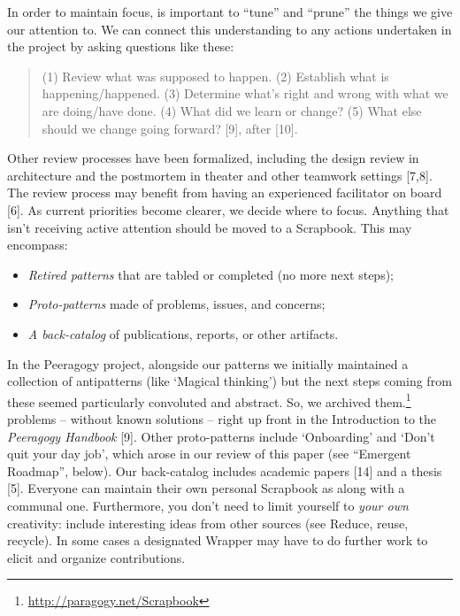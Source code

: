 In order to maintain focus, is important to ``tune'' and ``prune'' the
things we give our attention to. We can connect this understanding to
any actions undertaken in the project by asking questions like these:

\begin{quote}
(1) Review what was supposed to happen. (2) Establish what is
happening/happened. (3) Determine what's right and wrong with what we
are doing/have done. (4) What did we learn or change? (5) What else
should we change going forward? {{[}9{]}}, after {{[}10{]}}.
\end{quote}

Other review processes have been formalized, including the design review
in architecture and the postmortem in theater and other teamwork
settings {{[}7,8{]}}. The review process may benefit from having an
experienced facilitator on board {{[}6{]}}. As current priorities become
clearer, we decide where to focus. Anything that isn't receiving active
attention should be moved to a {{Scrapbook}}. This may encompass:

\begin{itemize}
\tightlist
\item
  \emph{Retired patterns} that are tabled or completed (no more next
  steps);
\item
  \emph{Proto-patterns} made of problems, issues, and concerns;
\item
  \emph{A back-catalog} of publications, reports, or other artifacts.
\end{itemize}

In the Peeragogy project, alongside our patterns we initially maintained
a collection of antipatterns (like `{{Magical thinking}}') but the next
steps coming from these seemed particularly convoluted and abstract. So,
we archived them.\footnote{\url{http://paragogy.net/Scrapbook}} problems
-- without known solutions -- right up front in the Introduction to the
\emph{Peeragogy Handbook} {{[}9{]}}. Other proto-patterns include
`{{Onboarding}}' and `{{Don't quit your day job}}', which arose in our
review of this paper (see ``Emergent Roadmap'', below). Our back-catalog
includes academic papers {{[}14{]}} and a thesis {{[}5{]}}. Everyone can
maintain their own personal {{Scrapbook}} as along with a communal one.
Furthermore, you don't need to limit yourself to \emph{your own}
creativity: include interesting ideas from other sources (see {{Reduce,
reuse, recycle}}). In some cases a designated {{Wrapper}} may have to do
further work to elicit and organize contributions.

